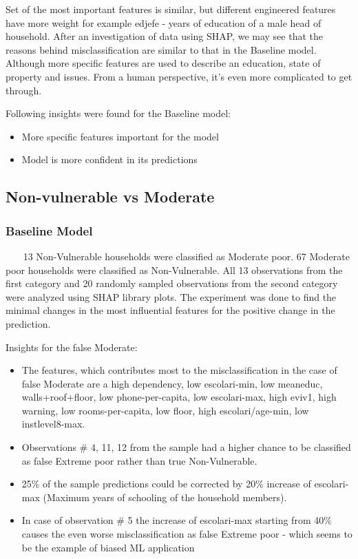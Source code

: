         Set of the most important features is similar, but different engineered features have more weight for example edjefe - years of education of a male head of household. After an investigation of data using SHAP, we may see that the reasons behind misclassification are similar to that in the Baseline model. Although more specific features are used to describe an education, state of property and issues. From a human perspective, it's even more complicated to get through.
        
        Following insights were found for the Baseline model:
        \begin{itemize}
            \item More specific features important for the model
            \item Model is more confident in its predictions
        \end{itemize}
        
    \subsection{Non-vulnerable vs Moderate}
    \subsubsection{Baseline Model}~~~
        13 Non-Vulnerable households were classified as Moderate poor. 67 Moderate poor households were classified as Non-Vulnerable. All 13 observations from the first category and 20 randomly sampled observations from the second category were analyzed using SHAP library plots. The experiment was done to find the minimal changes in the most influential features for the positive change in the prediction.

        Insights for the false Moderate:
        \begin{itemize}
            \item The features, which contributes most to the misclassification in the case of false Moderate are a high dependency, low escolari-min, low meaneduc, walls+roof+floor, low phone-per-capita, low escolari-max, high eviv1, high warning, low rooms-per-capita, low floor, high escolari/age-min, low instlevel8-max. 
            \item Observations \# 4, 11, 12 from the sample had a higher chance to be classified as false Extreme poor rather than true Non-Vulnerable. 
            \item 25\% of the sample predictions could be corrected by 20\% increase of escolari-max (Maximum years of schooling of the household members). 
            \item In case of observation \# 5 the increase of escolari-max starting from 40\% causes the even worse misclassification as false Extreme poor - which seems to be the example of biased ML application
        \end{itemize}
        
